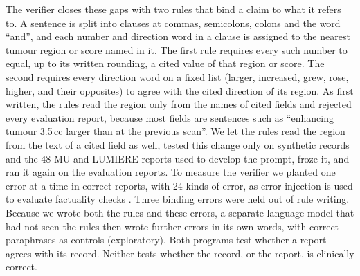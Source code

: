 The verifier closes these gaps with two rules that bind a claim to what it refers to. A sentence is split into clauses
at commas, semicolons, colons and the word ``and'', and each number and direction word in a clause is assigned to the
nearest tumour region or score named in it. The first rule requires every such number to equal, up to its written
rounding, a cited value of that region or score. The second requires every direction word on a fixed list (larger,
increased, grew, rose, higher, and their opposites) to agree with the cited direction of its region. As first
written, the rules read the region only from the names of cited fields and rejected every evaluation report, because
most fields are sentences such as ``enhancing tumour 3.5\,cc larger than at the previous scan''. We let the rules read
the region from the text of a cited field as well, tested this change only on synthetic records and the 48 MU and
LUMIERE reports used to develop the prompt, froze it, and ran it again on the evaluation reports. To measure the
verifier we planted one error at a time in correct reports, with 24 kinds of error, as error injection is used to
evaluate factuality checks \citep{gabriel2021,rao2025rexerr}. Three binding errors were held out of rule writing.
Because we wrote both the rules and these errors, a separate language model that had not seen the rules then wrote
further errors in its own words, with correct paraphrases as controls (exploratory). Both programs test whether a
report agrees with its record. Neither tests whether the record, or the report, is clinically correct.

